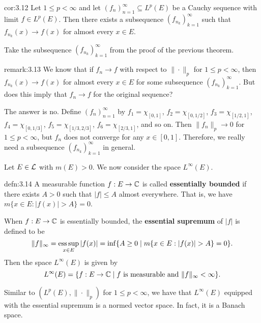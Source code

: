 \begin{cor}{cor:3.12}
    Let $1 \leq p < \infty$ and let $(f_n)_{n=1}^\infty \subseteq L^p(E)$ 
    be a Cauchy sequence with limit $f \in L^p(E)$. Then there exists a 
    subsequence $(f_{n_k})_{k=1}^\infty$ such that $f_{n_k}(x) \to f(x)$ 
    for almost every $x \in E$. 
\end{cor}
\begin{pf}
    Take the subsequence $(f_{n_k})_{k=1}^\infty$ from the proof of the 
    previous theorem. 
\end{pf}

\begin{remark}{remark:3.13}
    We know that if $f_n \to f$ with respect to $\|\cdot\|_p$ for 
    $1 \leq p < \infty$, then $f_{n_k}(x) \to f(x)$ for almost every 
    $x \in E$ for some subsequence $(f_{n_k})_{k=1}^\infty$. But 
    does this imply that $f_n \to f$ for the original sequence? 

    The answer is no. Define $(f_n)_{n=1}^\infty$ by $f_1 = \chi_{[0, 1]}$,
    $f_2 = \chi_{[0, 1/2]}$, $f_3 = \chi_{[1/2, 1]}$, $f_4 = \chi_{[0, 1/3]}$,
    $f_5 = \chi_{[1/3, 2/3]}$, $f_6 = \chi_{[2/3, 1]}$, and so on. Then 
    $\|f_n\|_p \to 0$ for $1 \leq p < \infty$, but $f_n$ does not converge 
    for any $x \in [0, 1]$. Therefore, we really need a subsequence 
    $(f_{n_k})_{k=1}^\infty$ in general. 
\end{remark}

Let $E \in {\cal L}$ with $m(E) > 0$. We now consider the space $L^\infty(E)$.

\begin{defn}{defn:3.14}
    A measurable function $f : E \to \mathbb{C}$ is called {\bf essentially bounded} 
    if there exists $A > 0$ such that $|f| \leq A$ almost everywhere. 
    That is, we have $m\{x \in E : |f(x)| > A\} = 0$. 

    When $f : E \to \mathbb{C}$ is essentially bounded, the {\bf essential supremum} 
    of $|f|$ is defined to be 
    \[ \|f\|_\infty = \operatorname*{ess\,sup}_{x\in E} |f(x)| = 
    \inf\{A \geq 0 \mid m\{x \in E : |f(x)| > A\} = 0\}. \] 
    Then the space $L^\infty(E)$ is given by 
    \[ L^\infty(E) = \{f : E \to \mathbb{C} \mid f \text{ is measurable and } 
    \|f\|_\infty < \infty\}. \] 
\end{defn}

Similar to $(L^p(E), \|\cdot\|_p)$ for $1 \leq p < \infty$, we have that 
$L^\infty(E)$ equipped with the essential supremum is a normed vector space. 
In fact, it is a Banach space. 

